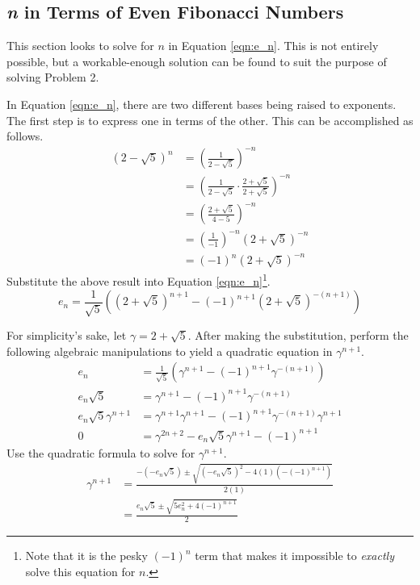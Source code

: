 \documentclass[titlepage]{article}
\begin{document}
\subsection{\emph{n} in Terms of Even Fibonacci Numbers}
This section looks to solve for $n$ in Equation \ref{eqn:e_n}. This is not entirely possible, but a workable-enough solution can be found to suit the purpose of solving Problem 2.\par
In Equation \ref{eqn:e_n}, there are two different bases being raised to exponents. The first step is to express one in terms of the other. This can be accomplished as follows.
\begin{align*}
    (2-\sqrt{5})^n &= \left( \frac{1}{2-\sqrt{5}} \right)^{-n}\\
    &= \left( \frac{1}{2-\sqrt{5}}\cdot\frac{2+\sqrt{5}}{2+\sqrt{5}} \right)^{-n}\\
    &= \left( \frac{2+\sqrt{5}}{4-5} \right)^{-n}\\
    &= \left( \frac{1}{-1} \right)^{-n}\left( 2+\sqrt{5} \right)^{-n}\\
    &= (-1)^n\left( 2+\sqrt{5} \right)^{-n}
\end{align*}
Substitute the above result into Equation \ref{eqn:e_n}\footnote{Note that it is the pesky $(-1)^n$ term that makes it impossible to \emph{exactly} solve this equation for $n$.}.
\begin{equation*}
    e_n = \frac{1}{\sqrt{5}}\left( \left( 2+\sqrt{5} \right)^{n+1}-(-1)^{n+1}\left( 2+\sqrt{5} \right)^{-(n+1)} \right)
\end{equation*}\par
For simplicity's sake, let $\gamma=2+\sqrt{5}$. After making the substitution, perform the following algebraic manipulations to yield a quadratic equation in $\gamma^{n+1}$.
\begin{align*}
    e_n &= \frac{1}{\sqrt{5}}\left( \gamma^{n+1}-(-1)^{n+1}\gamma^{-(n+1)} \right)\\
    e_n\sqrt{5} &= \gamma^{n+1}-(-1)^{n+1}\gamma^{-(n+1)}\\
    e_n\sqrt{5}\gamma^{n+1} &= \gamma^{n+1}\gamma^{n+1}-(-1)^{n+1}\gamma^{-(n+1)}\gamma^{n+1}\\
    0 &= \gamma^{2n+2}-e_n\sqrt{5}\gamma^{n+1}-(-1)^{n+1}
\end{align*}
Use the quadratic formula to solve for $\gamma^{n+1}$.
\begin{align*}
    \gamma^{n+1} &= \frac{-(-e_n\sqrt{5})\pm\sqrt{(-e_n\sqrt{5})^2-4(1)(-(-1)^{n+1})}}{2(1)}\\
    &= \frac{e_n\sqrt{5}\pm\sqrt{5e_n^2+4(-1)^{n+1}}}{2}
\end{align*}
\end{document}
